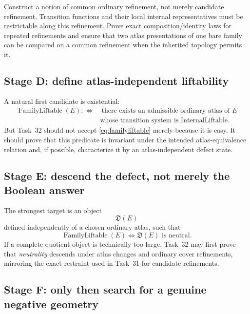 \documentclass[11pt,a4paper]{article}
\theoremstyle{definition}
\newcommand{\Def}{\mathfrak{D}}
\begin{document}
Construct a notion of common ordinary refinement, not merely candidate refinement.  Transition functions and their local internal representatives must be restrictable along this refinement.  Prove exact composition/identity laws for repeated refinements and ensure that two atlas presentations of one bare family can be compared on a common refinement when the inherited topology permits it.

\subsection{Stage D: define atlas-independent liftability}

A natural first candidate is existential:
\begin{equation}\label{eq:familyliftable}
\begin{aligned}
 \operatorname{FamilyLiftable}(E)
 :\Longleftrightarrow{}&\ \text{there exists an admissible ordinary atlas of }E\\
 &\text{whose transition system is InternalLiftable}.
\end{aligned}
\end{equation}
But Task~32 should not accept \cref{eq:familyliftable} merely because it is easy.  It should prove that this predicate is invariant under the intended atlas-equivalence relation and, if possible, characterize it by an atlas-independent defect state.

\subsection{Stage E: descend the defect, not merely the Boolean answer}

The strongest target is an object
\[
 \Def(E)
\]
defined independently of a chosen ordinary atlas, such that
\begin{equation}\label{eq:intrinsic-defect}
 \boxed{
 \operatorname{FamilyLiftable}(E)
 \iff
 \Def(E)\text{ is neutral}.}
\end{equation}
If a complete quotient object is technically too large, Task~32 may first prove that \emph{neutrality} descends under atlas changes and ordinary cover refinements, mirroring the exact restraint used in Task~31 for candidate refinements.

\subsection{Stage F: only then search for a genuine negative geometry}
\end{document}
